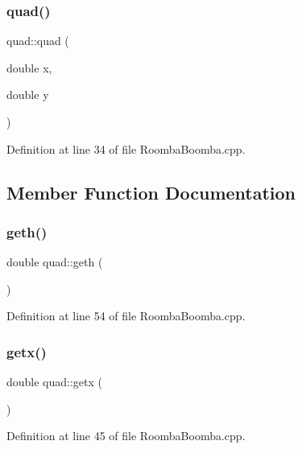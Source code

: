 \subsubsection{\texorpdfstring{quad()}{quad()}}
{\footnotesize\ttfamily quad\+::quad (\begin{DoxyParamCaption}\item[{double}]{x,  }\item[{double}]{y }\end{DoxyParamCaption})\hspace{0.3cm}{\ttfamily [inline]}}



Definition at line 34 of file Roomba\+Boomba.\+cpp.



\subsection{Member Function Documentation}
\mbox{\label{classquad_a5480be82873879e99a6ecfc7f88b9e9f}} 
\subsubsection{\texorpdfstring{geth()}{geth()}}
{\footnotesize\ttfamily double quad\+::geth (\begin{DoxyParamCaption}{ }\end{DoxyParamCaption})\hspace{0.3cm}{\ttfamily [inline]}}



Definition at line 54 of file Roomba\+Boomba.\+cpp.

\mbox{\label{classquad_a523cbb3471554c68e1fbb549d6ad991e}} 
\subsubsection{\texorpdfstring{getx()}{getx()}}
{\footnotesize\ttfamily double quad\+::getx (\begin{DoxyParamCaption}{ }\end{DoxyParamCaption})\hspace{0.3cm}{\ttfamily [inline]}}



Definition at line 45 of file Roomba\+Boomba.\+cpp.

